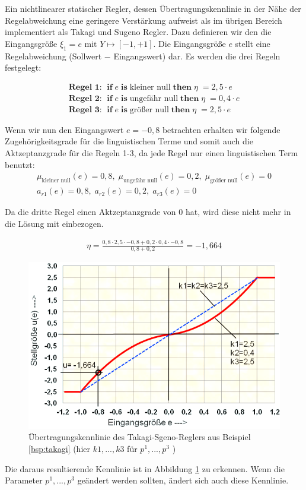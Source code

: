 \documentclass[12pt,a4paper,bibliography=totocnumbered,listof=totocnumbered, abstracton]{scrartcl}
\theoremstyle{Umgebung}
\begin{document}
\begin{bsp}
	\label{bsp:takagi}
	Ein nichtlinearer statischer Regler, dessen Übertragungskennlinie in der Nähe der Regelabweichung eine geringere Verstärkung aufweist als im übrigen Bereich implementiert als Takagi und Sugeno Regler. Dazu definieren wir den die Eingangsgröße $\xi_1 = e \text{ mit } Y \mapsto \left[-1,+1\right]$. Die Eingangsgröße $e$ stellt eine Regelabweichung (Sollwert $ - $ Eingangswert) dar. Es werden die drei Regeln festgelegt:
	
	\begin{gather*}
	\textbf{Regel 1: } \; \textbf{if} \; e \; \textbf{is} \; \text{kleiner null} \; \textbf{then} \; \eta \; = 2,5 \cdot e  \\ 
	\textbf{Regel 2: } \; \textbf{if} \; e \; \textbf{is} \; \text{ungefähr null} \; \textbf{then} \; \eta \; = 0,4 \cdot e   \\ 
	\textbf{Regel 3: } \; \textbf{if} \; e \; \textbf{is} \; \text{größer null} \; \textbf{then} \; \eta \; = 2,5 \cdot e
	\end{gather*}
	
	Wenn wir nun den Eingangswert $e=-0,8$ betrachten erhalten wir folgende Zugehörigkeitsgrade für die linguistischen Terme und somit auch die Aktzeptanzgrade für die Regeln 1-3, da jede Regel nur einen linguistischen Term benutzt:
	\begin{gather*}
		\mu_{\text{kleiner null}} (e) = 0,8 ,\; \mu_{\text{ungefähr null}} (e) = 0,2 ,\; \mu_{\text{größer null}}(e) = 0 \\
		a_{r1} (e) = 0,8 ,\; a_{r2} (e) = 0,2 ,\; a_{r3}(e) = 0
	\end{gather*}
	
	Da die dritte Regel einen Aktzeptanzgrade von $0$ hat, wird diese nicht mehr in die Lösung mit einbezogen.
	
	\begin{gather*}
		 \eta = \frac{0,8 \cdot 2,5 \cdot -0,8 + 0,2 \cdot 0,4 \cdot -0,8}{0,8 + 0,2} = -1,664
	\end{gather*}

	\begin{figure}
		\centering
		\includegraphics[width=0.7\linewidth]{img/Takagi}
		\caption{Übertragungskennlinie des Takagi-Sgeno-Reglers aus Beispiel \ref{bsp:takagi} (hier $k1, ..., k3$ für $p^1, ..., p^3$ )}
		\label{fig:takagi}
	\end{figure}

	Die daraus resultierende Kennlinie ist in Abbildung \ref{fig:takagi} zu erkennen. Wenn die Parameter $p^1, ..., p^3$ geändert werden sollten, ändert sich auch diese Kennlinie.
\end{bsp}
\end{document}
